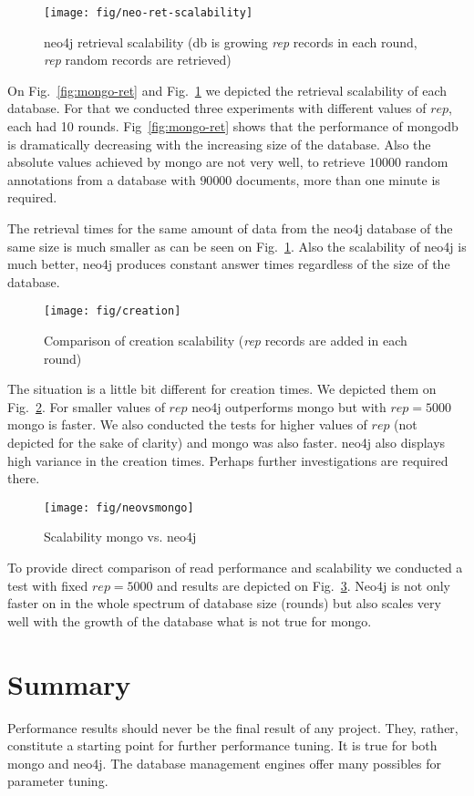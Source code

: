 \documentclass[a4paper,10pt]{article}
\begin{document}
\begin{figure}
\centering
 \texttt{[image: fig/neo-ret-scalability]}
 \caption{neo4j retrieval scalability (db is growing \emph{rep} records in each round, \emph{rep} random records are retrieved)} \label{fig:neo-ret}
\end{figure}

On Fig.~\ref{fig:mongo-ret} and Fig.~\ref{fig:neo-ret} we depicted the retrieval scalability 
of each database. For that we conducted three experiments with different values of $rep$, each 
had 10 rounds. Fig~\ref{fig:mongo-ret} shows that the performance of mongodb is 
dramatically decreasing with the increasing size of the database. Also the absolute values 
achieved by mongo are not very well, to retrieve $10000$ random annotations from a database 
with $90 000$ documents, more than one minute is required. 

The retrieval times for the same amount of data from the neo4j database of the same size is 
much smaller as can be seen on Fig.~\ref{fig:neo-ret}. Also the scalability of neo4j is 
much better, neo4j produces constant answer times regardless of the size of the database. 


\begin{figure}
\centering
 \texttt{[image: fig/creation]}
 \caption{Comparison of creation scalability (\emph{rep} records are added in each round)} \label{fig:creation}
\end{figure}

The situation is a little bit different for creation times. We depicted them on 
Fig.~\ref{fig:creation}. For smaller values of $rep$ neo4j outperforms mongo but 
with $rep = 5000$ mongo is faster. We also conducted the tests for higher values of 
$rep$ (not depicted for the sake of clarity) and mongo was also faster. neo4j 
also displays high variance in the creation times. Perhaps further investigations
are required there. 

\begin{figure}
\centering
 \texttt{[image: fig/neovsmongo]}
 \caption{Scalability mongo vs. neo4j} \label{fig:mongovsneo}
\end{figure}

To provide direct comparison of read performance and scalability we conducted 
a test with fixed $rep=5000$ and results are depicted on Fig.~\ref{fig:mongovsneo}.
Neo4j is not only faster on in the whole spectrum of database size (rounds) but 
also scales very well with the growth of the database what is not true for mongo.


\section{Summary}
Performance results should never be the final result of any project. They, rather, constitute
a starting point for further performance tuning. It is true for both mongo and neo4j. The database
management engines offer many possibles for parameter tuning. 
\end{document}
